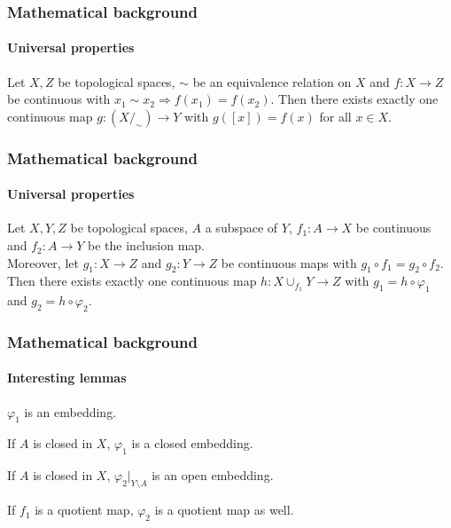\documentclass{beamer}
\begin{document}
	\begin{frame}[fragile]
		\frametitle{Mathematical background}
		\framesubtitle{Universal properties}
		\begin{theorem}
			Let $X, Z$ be topological spaces, $\sim$ be an equivalence relation on $X$ and $f : X \to Z$ be continuous with $x_1 \sim x_2 \Rightarrow f(x_1) = f(x_2)$. Then there exists exactly one continuous map $g : (X /_{\sim}) \to Y$ with $g([x]) = f(x)$ for all $x \in X$. 
		\end{theorem}
	\end{frame}
	\begin{frame}[fragile]
		\frametitle{Mathematical background}
		\framesubtitle{Universal properties}
		\begin{theorem}
			Let $X, Y, Z$ be topological spaces, $A$ a subspace of $Y$, $f_1 : A \to X$ be continuous and $f_2 : A \to Y$ be the inclusion map.\\
			Moreover, let $g_1 : X \to Z$ and $g_2 : Y \to Z$ be continuous maps with $g_1 \circ f_1 = g_2 \circ f_2$. \\
			Then there exists exactly one continuous map $h : X \cup_{f_1} Y \to Z$ with $g_1 = h \circ \varphi_1$ and $g_2 = h \circ \varphi_2$.
		\end{theorem}
	\end{frame}
	\begin{frame}
		\frametitle{Mathematical background}
		\framesubtitle{Interesting lemmas}
		\begin{lemma}
			$\varphi_1$ is an embedding.
		\end{lemma}
		\pause[2]
		\begin{lemma}
			If $A$ is closed in $X$, $\varphi_1$ is a closed embedding.
		\end{lemma}
		\pause[3]
		\begin{lemma}
			If $A$ is closed in $X$, $\varphi_2 \vert_{Y \setminus A}$ is an open embedding.
		\end{lemma}
		\pause[4]
		\begin{lemma}
			If $f_1$ is a quotient map, $\varphi_2$ is a quotient map as well.
		\end{lemma}
	\end{frame}
\end{document}
